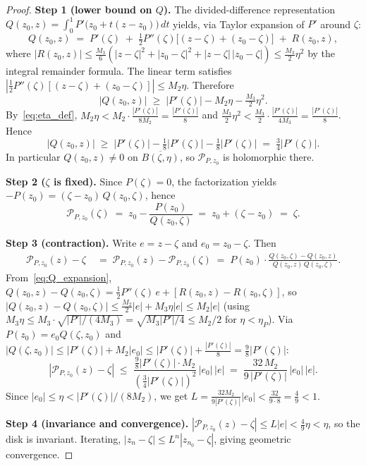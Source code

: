 \documentclass[10pt,a4paper,oneside]{book}
\theoremstyle{definition}
\theoremstyle{remark}
\begin{document}
\begin{proof}
\textbf{Step 1 (lower bound on $Q$).}  The divided-difference representation $Q(z_0,z) = \int_0^1 P'\!\bigl(z_0 + t(z-z_0)\bigr)\,dt$ yields, via Taylor expansion of $P'$ around $\zeta$:
\begin{equation}
  \label{eq:Q_expansion}
  Q(z_0, z) \;=\; P'(\zeta) \;+\; \tfrac{1}{2} P''(\zeta)\bigl[(z - \zeta) + (z_0 - \zeta)\bigr] \;+\; R(z_0, z),
\end{equation}
where $|R(z_0,z)| \leq \frac{M_3}{6}(|z-\zeta|^2 + |z_0 - \zeta|^2 + |z-\zeta|\,|z_0-\zeta|) \leq \frac{M_3}{2}\eta^2$ by the integral remainder formula.  The linear term satisfies $|\tfrac{1}{2}P''(\zeta)[(z-\zeta)+(z_0-\zeta)]| \leq M_2\eta$.  Therefore
\[
  |Q(z_0, z)| \;\geq\; |P'(\zeta)| - M_2\eta - \tfrac{M_3}{2}\eta^2.
\]
By~\eqref{eq:eta_def}, $M_2\eta < M_2 \cdot \frac{|P'(\zeta)|}{8M_2} = \frac{|P'(\zeta)|}{8}$ and $\frac{M_3}{2}\eta^2 < \frac{M_3}{2} \cdot \frac{|P'(\zeta)|}{4M_3} = \frac{|P'(\zeta)|}{8}$.  Hence
\begin{equation}
  \label{eq:Q_lower}
  |Q(z_0, z)| \;\geq\; |P'(\zeta)| - \tfrac{1}{8}|P'(\zeta)| - \tfrac{1}{8}|P'(\zeta)| \;=\; \tfrac{3}{4}|P'(\zeta)|.
\end{equation}
In particular $Q(z_0, z) \neq 0$ on $\overline{B(\zeta, \eta)}$, so $\mathcal{P}_{P,z_0}$ is holomorphic there.

\textbf{Step 2 ($\zeta$ is fixed).}  Since $P(\zeta) = 0$, the factorization yields $-P(z_0) = (\zeta - z_0)\, Q(z_0, \zeta)$, hence
\[
  \mathcal{P}_{P,z_0}(\zeta) \;=\; z_0 - \frac{P(z_0)}{Q(z_0, \zeta)} \;=\; z_0 + (\zeta - z_0) \;=\; \zeta.
\]

\textbf{Step 3 (contraction).}  Write $e = z - \zeta$ and $e_0 = z_0 - \zeta$.  Then
\begin{align*}
  \mathcal{P}_{P,z_0}(z) - \zeta
  &\;=\; \mathcal{P}_{P,z_0}(z) - \mathcal{P}_{P,z_0}(\zeta)
  \;=\; P(z_0)\cdot\frac{Q(z_0,\zeta) - Q(z_0,z)}{Q(z_0,z)\,Q(z_0,\zeta)}.
\end{align*}
From~\eqref{eq:Q_expansion}, $Q(z_0,z) - Q(z_0,\zeta) = \frac{1}{2}P''(\zeta)\,e + [R(z_0,z)-R(z_0,\zeta)]$, so $|Q(z_0,z) - Q(z_0,\zeta)| \leq \frac{M_2}{2}|e| + M_3\eta|e| \leq M_2|e|$ (using $M_3\eta \leq M_3 \cdot \sqrt{|P'|/(4M_3)} = \sqrt{M_3|P'|/4} \leq M_2/2$ for $\eta < \eta_P$).  Via $P(z_0) = e_0 Q(\zeta,z_0)$ and $|Q(\zeta,z_0)| \leq |P'(\zeta)| + M_2|e_0| \leq |P'(\zeta)| + \frac{|P'(\zeta)|}{8} = \frac{9}{8}|P'(\zeta)|$:
\begin{equation}
  \label{eq:error_main}
  |\mathcal{P}_{P,z_0}(z) - \zeta|
  \;\leq\;
  \frac{\frac{9}{8}|P'(\zeta)| \cdot M_2}{(\frac{3}{4}|P'(\zeta)|)^2}\,|e_0|\,|e|
  \;=\;
  \frac{32\, M_2}{9\,|P'(\zeta)|}\,|e_0|\,|e|.
\end{equation}
Since $|e_0| \leq \eta < |P'(\zeta)|/(8M_2)$, we get $L = \frac{32 M_2}{9|P'(\zeta)|}|e_0| < \frac{32}{9 \cdot 8} = \frac{4}{9} < 1$.

\textbf{Step 4 (invariance and convergence).}  $|\mathcal{P}_{P,z_0}(z) - \zeta| \leq L|e| < \frac{4}{9}\eta < \eta$, so the disk is invariant.  Iterating, $|z_n - \zeta| \leq L^n |z_{n_0} - \zeta|$, giving geometric convergence.
\end{proof}
\end{document}
